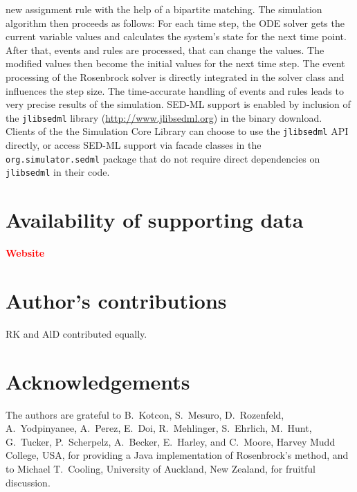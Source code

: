 \documentclass[10pt]{bmc_article}
\newenvironment{bmcformat}{\baselineskip20pt\sloppy\setboolean{publ}{false}}{\baselineskip20pt\sloppy}
\newcommand{\TODO}[1]{\textcolor{red}{\textbf{#1}}}
\newcommand{\jlibsedml}{\texttt{jlibsedml}}
\begin{document}
\begin{bmcformat}
new assignment rule with the help of a bipartite matching.
%
The simulation algorithm then proceeds as follows: For each time step, the ODE
solver gets the current variable values and
calculates the system's state for the next time point. After that, events
and rules are processed, that can change the values. The modified values then
become the initial values for the next time step. The event processing of the
Rosenbrock solver
is directly integrated in the solver class and influences the
step size. The time-accurate handling of events and rules leads to very precise
results of the simulation.
%
SED-ML support is enabled by inclusion of the \jlibsedml{} library
(\href{http://www.jlibsedml.org}{http://www.jlibsedml.org}) in the binary
download. Clients of the the Simulation Core Library can choose to use the
\jlibsedml{} API directly, or access SED-ML support via  facade classes
in the \texttt{org.simulator.sedml} package that do not require direct
dependencies on \jlibsedml{} in their code.


\section{Availability of supporting data}

\TODO{Website}

\bigskip

\section*{Author's contributions}
   RK and AlD contributed equally.

    

\section*{Acknowledgements}
The authors are grateful to B.~Kotcon, S.~Mesuro, D.~Rozenfeld, A.~Yodpinyanee,
A.~Perez, E.~Doi, R.~Mehlinger, S.~Ehrlich, M.~Hunt, G.~Tucker, P.~Scherpelz,
A.~Becker, E.~Harley, and C.~Moore, Harvey Mudd College, USA, for providing a
Java implementation of Rosenbrock's method, and to Michael T.~Cooling,
University of Auckland, New Zealand, for fruitful discussion.


\end{bmcformat}
\end{document}
